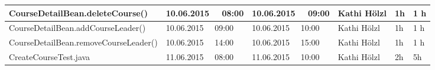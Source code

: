 \begin{landscape}
\begin{tabular}{|p{10.3cm}|p{3.2cm}|p{3.2cm}|p{3.5cm}|p{1.7cm}|p{1.5cm}|}
		\hline   CourseDetailBean.deleteCourse()                             & 10.06.2015 \ \ 08:00     & 10.06.2015 \ \ 09:00       & Kathi Hölzl &   1h&   1 h\\
		\hline   CourseDetailBean.addCourseLeader()                          & 10.06.2015 \ \ 09:00     & 10.06.2015 \ \ 10:00       & Kathi Hölzl &   1h&   1 h\\
		\hline   CourseDetailBean.removeCourseLeader()                       & 10.06.2015 \ \ 14:00     & 10.06.2015 \ \ 15:00       & Kathi Hölzl &   1h&   1 h\\
		\hline   CreateCourseTest.java                                       & 11.06.2015 \ \ 08:00     & 11.06.2015 \ \ 10:00           & Kathi Hölzl  &      2h         &      5h        \\
		\hline 
	\end{tabular} \ \\
	\ \\
	

\end{landscape}
